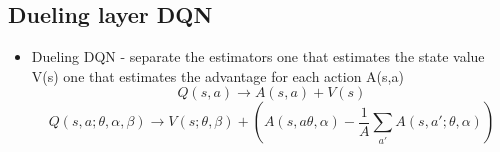 \subsection{Dueling layer DQN}
 \begin{itemize}
\item Dueling DQN - separate the estimators
one that estimates the state value V(s)
one that estimates the advantage for each action A(s,a)
\begin{equation}
Q(s,a) \rightarrow A(s,a) + V(s)
\end{equation}
\begin{equation}
Q(s,a; \theta, \alpha, \beta) \rightarrow V(s; \theta, \beta) + (A(s,a\theta, \alpha) - \frac{1}{A} \sum_{a'}^{} A(s,a';\theta,\alpha ))
\end{equation}
\end{itemize}
